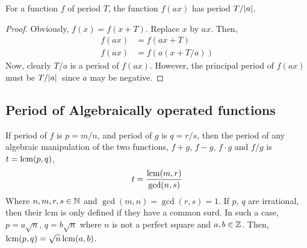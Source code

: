 \begin{claim}
    For a function \(f\) of period \(T\), the function \(f(ax)\) has period \(T/\abs{a}\).
\end{claim}

\begin{proof}
    Obviously, \(f(x) = f(x + T)\). Replace \(x\) by \(ax\). Then,
    \begin{align*}
        f(ax) &= f(ax + T) \\
        f(ax) &= f(a(x + T/a))
    \end{align*}
    Now, clearly \(T/a\) is a period of \(f(ax)\). However, the principal period of \(f(ax)\) must be 
    \(T/\abs*{a}\) since \(a\) may be negative.
\end{proof}

\subsection{Period of Algebraically operated functions}

If period of \(f\) is \(p = m/n\), and period of \(g\) is \(q = r/s\), then
the period of any algebraic manipulation of the two functions, \(f + g\), \(f - g\), 
\(f \cdot g\) and \(f/g\) is \(t = \operatorname*{lcm}(p,q)\),
\[
    t = \frac{\operatorname*{lcm}(m, r)}{\gcd(n, s)}\]
Where \(n, m, r, s \in \mathbb N\) and \(\gcd(m,n) = \gcd(r,s) = 1\). 
If \(p\), \(q\) are irrational, then their lcm is only defined if they have a common surd.
In such a case, \(p = a\sqrt{n}\), \(q = b\sqrt{n}\) where \(n\) is not a perfect square and
\(a, b \in \mathbb Z\). Then, \(\operatorname*{lcm}(p,q) = \sqrt{n} \operatorname*{lcm}(a,b)\). 